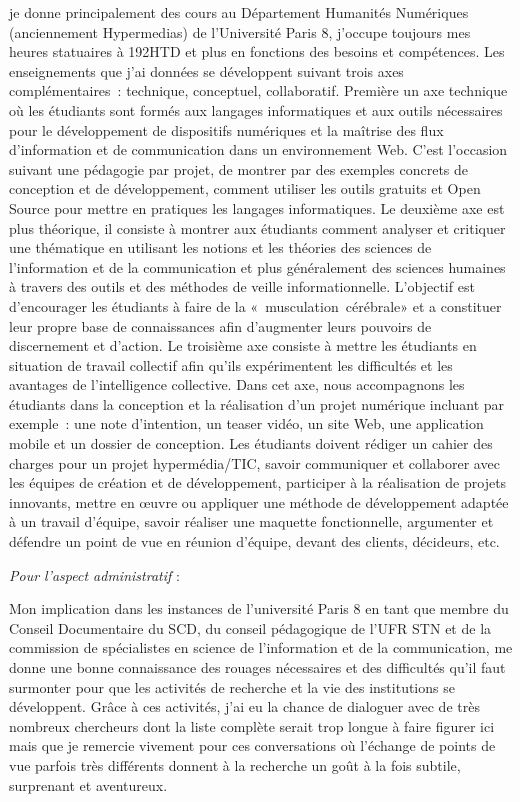 \documentclass[
  a4paper,
  DIV=11,
  numbers=noendperiod]{scrreprt}
\begin{document}
je donne principalement des cours au Département Humanités Numériques
(anciennement Hypermedias) de l'Université Paris 8, j'occupe toujours
mes heures statuaires à 192HTD et plus en fonctions des besoins et
compétences. Les enseignements que j'ai données se développent suivant
trois axes complémentaires~: technique, conceptuel, collaboratif.
Première un axe technique où les étudiants sont formés aux langages
informatiques et aux outils nécessaires pour le développement de
dispositifs numériques et la maîtrise des flux d'information et de
communication dans un environnement Web. C'est l'occasion suivant une
pédagogie par projet, de montrer par des exemples concrets de conception
et de développement, comment utiliser les outils gratuits et Open Source
pour mettre en pratiques les langages informatiques. Le deuxième axe est
plus théorique, il consiste à montrer aux étudiants comment analyser et
critiquer une thématique en utilisant les notions et les théories des
sciences de l'information et de la communication et plus généralement
des sciences humaines à travers des outils et des méthodes de veille
informationnelle. L'objectif est d'encourager les étudiants à faire de
la «~musculation~cérébrale» et a constituer leur propre base de
connaissances afin d'augmenter leurs pouvoirs de discernement et
d'action. Le troisième axe consiste à mettre les étudiants en situation
de travail collectif afin qu'ils expérimentent les difficultés et les
avantages de l'intelligence collective. Dans cet axe, nous accompagnons
les étudiants dans la conception et la réalisation d'un projet numérique
incluant par exemple~: une note d'intention, un teaser vidéo, un site
Web, une application mobile et un dossier de conception. Les étudiants
doivent rédiger un cahier des charges pour un projet hypermédia/TIC,
savoir communiquer et collaborer avec les équipes de création et de
développement, participer à la réalisation de projets innovants, mettre
en œuvre ou appliquer une méthode de développement adaptée à un travail
d'équipe, savoir réaliser une maquette fonctionnelle, argumenter et
défendre un point de vue en réunion d'équipe, devant des clients,
décideurs, etc.

\emph{Pour l'aspect administratif} :

Mon implication dans les instances de l'université Paris 8 en tant que
membre du Conseil Documentaire du SCD, du conseil pédagogique de l'UFR
STN et de la commission de spécialistes en science de l'information et
de la communication, me donne une bonne connaissance des rouages
nécessaires et des difficultés qu'il faut surmonter pour que les
activités de recherche et la vie des institutions se développent. Grâce
à ces activités, j'ai eu la chance de dialoguer avec de très nombreux
chercheurs dont la liste complète serait trop longue à faire figurer ici
mais que je remercie vivement pour ces conversations où l'échange de
points de vue parfois très différents donnent à la recherche un goût à
la fois subtile, surprenant et aventureux.
\end{document}
